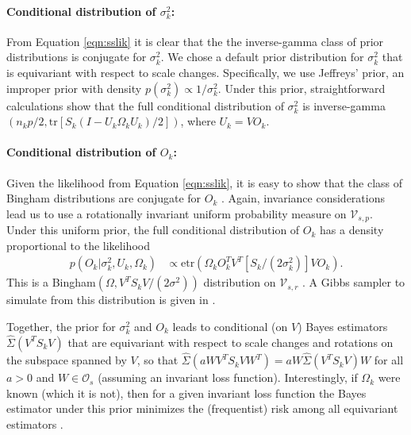 \documentclass{statsoc}
\newcommand{\tr}{\text{tr}}
\newcommand{\etr}{\text{etr}}
\begin{document}
\paragraph{Conditional distribution of $\sigma_k^2$:}

From Equation \ref{eqn:sslik} it is clear that the the inverse-gamma
class of prior distributions is conjugate for $\sigma_k^2$.  We chose a
default prior distribution for $\sigma^2_k$ that is equivariant with
respect to scale changes.  Specifically, we use Jeffreys' prior, an
improper prior with density $p(\sigma^2_k) \propto 1/\sigma^2_k $.  Under
this prior, straightforward calculations show that the full
conditional distribution of $\sigma_k^2$ is
inverse-gamma$( n_k p/2 , \tr[S_k( I - U_k\Omega_k
U_k)/2])$, where $U_k = VO_k$.

\paragraph{Conditional distribution of $O_k$:} Given the likelihood
from Equation \ref{eqn:sslik}, it is easy to show that the class of
Bingham distributions are conjugate for $O_k$ \citep{Hoff2009,
  Hoff2012}.  Again, invariance considerations lead us to use a
rotationally invariant uniform probability measure on
$\mathcal V_{s,p}$.  Under this uniform prior, the full conditional
distribution of $O_k$ has a density proportional to the
likelihood
\begin{align}
\label{lik_vo}
 p(O_k | \sigma^2_k, U_k, \Omega_k) & \propto \etr(\Omega_kO^T_kV^T[S_k/(2\sigma^2_k)]VO_k).
\end{align}
%
\noindent This is a Bingham$(\Omega, V^T S_k V/(2\sigma^2))$
distribution on $\mathcal V_{s, r}$ \citep{Khatri1977}. A
Gibbs sampler to simulate from this distribution is given in
\citet{Hoff2012}.  

Together, the prior for $\sigma_k^2$ and $O_k$ leads to conditional
(on $V$) Bayes estimators $\hat \Sigma(V^T S_k V)$ that are
equivariant with respect to scale changes and rotations on the
subspace spanned by $V$, so
that $\hat \Sigma(a W V^T S_k V W^T) = a W \hat\Sigma(V^T
S_k V)  W$
for all $a>0$ and $ W\in \mathcal O_{s}$ (assuming an invariant
loss function). Interestingly, if $\Omega_k$ were known (which it is
not), then for a given invariant loss function the Bayes estimator
under this prior minimizes the (frequentist) risk among all
equivariant estimators \citep{Eaton1989}.
\end{document}
